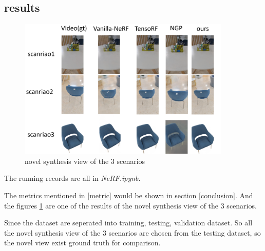 \subsection{results}
\begin{figure}
\includegraphics[width=0.9\textwidth]{result/result.png} 
\caption{novel synthesis view of the $3$ scenarios}
\label{result}
\end{figure}

The running records are all in \textit{NeRF.ipynb}.

The metrics mentioned in \ref{metric} would be shown in section \ref{conclusion}. And the figures \ref{result} are one of the results of the novel synthesis view of the $3$ scenarios.

Since the dataset are seperated into training, testing, validation dataset. So all the novel synthesis view of the $3$ scenarios are chosen from the testing dataset, so the novel view exist ground truth for comparison.
